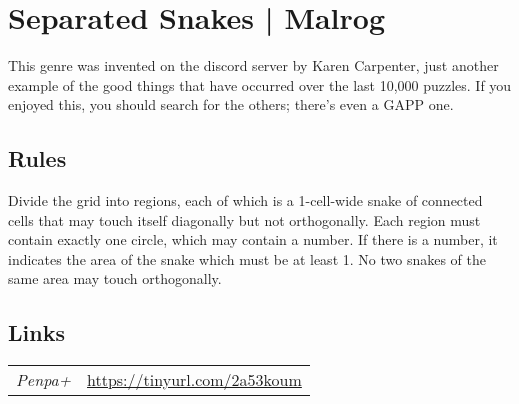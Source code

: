 \section{Separated Snakes | {\normalfont Malrog}}
\label{sec:41-separated-snakes-malrog}
This genre was invented on the discord server by Karen Carpenter, just another example of the good things that have occurred over the last 10,000 puzzles. If you enjoyed this, you should search for the others; there's even a GAPP one.
\subsection*{Rules}
\begin{markdown}
Divide the grid into regions, each of which is a 1-cell-wide snake of connected cells that may touch itself diagonally but not orthogonally. Each region must contain exactly one circle, which may contain a number. If there is a number, it indicates the area of the snake which must be at least 1. No two snakes of the same area may touch orthogonally.
\end{markdown}
\subsection*{Links}
\begin{tabularx}{\textwidth}{l X}
\emph{Penpa+} & \url{https://tinyurl.com/2a53koum} \\
\end{tabularx}
\pagebreak
